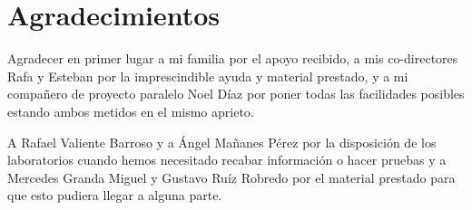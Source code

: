 \chapter*{Agradecimientos}

Agradecer en primer lugar a mi familia por el apoyo recibido, a mis co-directores Rafa y Esteban por la imprescindible ayuda y material prestado, y a mi compañero de proyecto paralelo Noel Díaz por poner todas las facilidades posibles estando ambos metidos en el mismo aprieto.

A Rafael Valiente Barroso y a Ángel Mañanes Pérez por la disposición de los laboratorios cuando hemos necesitado recabar información o hacer pruebas y a Mercedes Granda Miguel y Gustavo Ruíz Robredo por el material prestado para que esto pudiera llegar a alguna parte.